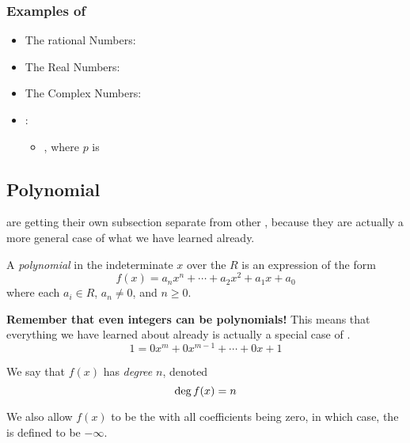 \subsubsection{Examples of }\label{subsubsec:Examples_of_Fields}
\begin{itemize}[noitemsep]
\item The rational Numbers: \TextRationalNumbers{}
\item The Real Numbers: \TextRealNumbers{}
\item The Complex Numbers: \TextComplexNumbers{}
\item {}:
  \begin{itemize}[noitemsep]
  \item {}, where $p$ is 
  \end{itemize}
\end{itemize}

\subsection{Polynomial }\label{subsec:Polynomial_Rings}
 are getting their own subsection separate from other , because they are actually a more general case of what we have learned already.
\begin{definition}[Polynomial]\label{def:Polynomial}
  A \emph{polynomial} in the indeterminate $x$ over the  $R$ is an expression of the form
  \begin{equation}\label{eq:Polynomial_Ring}
    f(x) = a_{n}x^{n} + \cdots + a_{2}x^{2} + a_{1}x + a_{0}
  \end{equation}
  where each $a_{i} \in R$, $a_{n} \neq 0$, and $n \geq 0$.

  \begin{remark}
    \textbf{Remember that even integers can be polynomials!}
    This means that everything we have learned about  already is actually a special case of .
    \begin{equation*}
      1 = 0x^{m} + 0x^{m-1} + \cdots + 0x + 1
    \end{equation*}
  \end{remark}
\end{definition}

\begin{definition}[Degree]\label{def:Polynomial_Degree}
  We say that $f(x)$ has \emph{degree} $n$, denoted
  \begin{equation}\label{eq:Polynomial_Degree}
    \operatorname{\text{deg}} f(x) = n
  \end{equation}

  \begin{remark}
    We also allow $f(x)$ to be the  with all coefficients being zero, in which case, the  is defined to be $-\infty$.
  \end{remark}
\end{definition}

